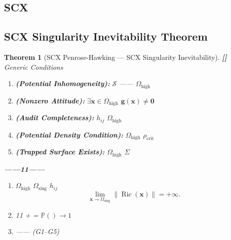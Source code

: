 \documentclass[12pt,a4paper]{article}
\newtheorem{theorem}{Theorem}[section]
\theoremstyle{remark}
\newcommand{\Pbb}{\mathbb{P}}
\newcommand{\g}{\mathbf{g}}
\newcommand{\x}{\mathbf{x}}
\DeclareMathOperator{\Ric}{Ric}
\newcommand{\rigorFull}{\textnormal{\textbf{[]}}}
\begin{document}
\subsection{SCX}
\subsection{SCX Singularity Inevitability Theorem}

\begin{theorem}[SCX Penrose-Hawking — SCX Singularity Inevitability]\label{thm:scx_penrose_hawking}\rigorFull
\textbf{}Generic Conditions
\begin{enumerate}[label=(G\arabic*), leftmargin=*]
    \item \textbf{ (Potential Inhomogeneity):}  $\mathcal{S}$ —— $\Omega_{\mathrm{high}}$
    \item \textbf{ (Nonzero Attitude):} $\exists \x \in \Omega_{\mathrm{high}}$  $\g(\x) \neq \mathbf{0}$
    \item \textbf{ (Audit Completeness):}  $h_{ij}$  $\Omega_{\mathrm{high}}$ 
    \item \textbf{ (Potential Density Condition):} $\Omega_{\mathrm{high}}$  $\rho_{\mathrm{crit}}$
    \item \textbf{ (Trapped Surface Exists):}  $\Omega_{\mathrm{high}}$  $\Sigma$
\end{enumerate}

\textbf{——11——}
\begin{enumerate}[label=(\roman*)]
    \item  $\Omega_{\mathrm{high}}$  $\Omega_{\mathrm{sing}}$  $h_{ij}$ 
    \begin{equation}
        \lim_{\x \to \Omega_{\mathrm{sing}}} \|\Ric(\x)\| = +\infty.
    \end{equation}
    \item 11\textbf{} +  =  $\Pbb(\text{}) \to 1$
    \item —— (G1--G5) 
\end{enumerate}
\end{theorem}
\end{document}
